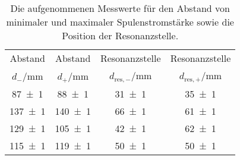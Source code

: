 \begin{table}[!h]
	\centering
	\begin{tabular}{cccc}
		\toprule
		Abstand & Abstand & Resonanzstelle & Resonanzstelle\\
		$d_{-}$/\si{\milli\meter} & $d_{+}$/\si{\milli\meter} & $d_{\mathrm{res,-}}$/\si{\milli\meter} & $d_{\mathrm{res,+}}$/\si{\milli\meter}\\
\midrule
		\num{87(1)} & \num{88(1)} & \num{31(1)} & \num{35(1)}\\
		\num{137(1)} & \num{140(1)} & \num{66(1)} & \num{61(1)}\\
		\num{129(1)} & \num{105(1)} & \num{42(1)} & \num{62(1)}\\
		\num{115(1)} & \num{119(1)} & \num{50(1)} & \num{50(1)}\\
		\bottomrule
	\end{tabular}
	\caption{Die aufgenommenen Messwerte für den Abstand von minimaler und maximaler Spulenstromstärke
sowie die Position der Resonanzstelle. \label{tab:messwerte_X}}
\end{table}
